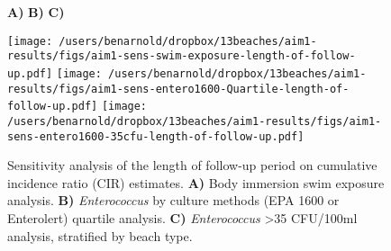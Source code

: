 \documentclass[12pt]{article}\usepackage[]{graphicx}\usepackage[]{color}
\begin{document}
\begin{landscape}
\begin{figure}[htbp]
{\large \hspace{1cm} \textbf{A)} \hspace{7cm} \textbf{B)}    \hspace{7cm} \textbf{C)} }\\

\begin{center}
 \texttt{[image: /users/benarnold/dropbox/13beaches/aim1-results/figs/aim1-sens-swim-exposure-length-of-follow-up.pdf]} 
 \texttt{[image: /users/benarnold/dropbox/13beaches/aim1-results/figs/aim1-sens-entero1600-Quartile-length-of-follow-up.pdf]} 
  \texttt{[image: /users/benarnold/dropbox/13beaches/aim1-results/figs/aim1-sens-entero1600-35cfu-length-of-follow-up.pdf]} 

\begin{minipage}{1.2\textwidth}

\caption{Sensitivity analysis of the length of follow-up period on cumulative incidence ratio (CIR) estimates. \textbf{A)} Body immersion swim exposure analysis. \textbf{B)} \textit{Enterococcus} by culture methods (EPA 1600 or Enterolert) quartile analysis. \textbf{C)} \textit{Enterococcus} >35 CFU/100ml analysis, stratified by beach type. \label{fig:fulengthsens} }
\end{minipage}
\end{center}
\end{figure}
\end{landscape}




\printbibliography
%  
\end{document}
